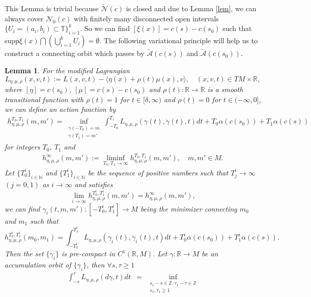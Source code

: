 \documentclass{amsart}
\newtheorem{lem}[thm]{Lemma}
\begin{document}
This Lemma is trivial because $\widetilde{\mathcal{N}}(c)$ is closed and due to Lemma \ref{lem}, we can always cover ${\mathcal{N}}_0(c)$ with finitely many disconnected open intervals $\{U_i=(a_i,b_i)\subset{\mathbb{T}}\}_{i=1}^k$. So we can find $[\xi(x)]=c(s)-c(s_0)$ such that supp$\xi(x)\bigcap(\bigcup_{i=1}^kU_i)=\emptyset$. The following variational principle will help us to construct a connecting orbit which passes by $\widetilde{\mathcal{A}}(c(s))$ and $\widetilde{\mathcal{A}}(c(s_0))$.
\begin{lem}\cite{CY1, CY2}
For the modified Lagrangian
\[
L_{\eta,\mu,\rho}(x,v,t):=L(x,v,t)-\langle\eta(x)+\rho(t)\mu(x),v\rangle,\quad(x,v,t)\in TM\times{\mathbb{R}},
\]
where $[\eta]=c(s_0)$, $[\mu]=c(s)-c(s_0)$ and $\rho(t):{\mathbb{R}}\rightarrow{\mathbb{R}}$ is a smooth transitional function with $\rho(t)=1$ for $t\in[\delta,\infty)$ and $\rho(t)=0$ for $t\in(-\infty,0]$, we can define an action function by
\begin{eqnarray}
h_{\eta,\mu,\rho}^{T_0,T_1}(m,m')=\inf_{\substack{\gamma(-T_0)=m\\ \gamma(T_1)=m'}}\int_{-T_0}^{T_1}L_{\eta,\mu,\rho}(\gamma(t),\dot{\gamma}(t),t)dt+T_0\alpha(c(s_0))+T_1\alpha(c(s))
\end{eqnarray}
for integers $T_0$, $T_1$ and
\begin{eqnarray}\label{pseudo}
h_{\eta,\mu,\rho}^\infty(m,m'):=\liminf_{T_0,T_1\rightarrow\infty}h_{\eta,\mu,\rho}^{T_0,T_1}(m,m'),\quad m,m'\in M.
\end{eqnarray}
Let $\{T_0^i\}_{i\in\mathbb{N}}$ and $\{T_1^i\}_{i\in\mathbb{N}}$ be the sequence of positive numbers such that $T_j^i\rightarrow\infty$ $(j=0,1)$ as $i\rightarrow\infty$ and satisfies
\[
\lim_{i\rightarrow\infty}h_{\eta,\mu,\rho}^{T_0^i,T_1^i}(m,m')=h_{\eta,\mu,\rho}^{\infty}(m,m'),
\]
we can find $\gamma_i(t,m,m'):[-T_0^i,T_1^i]\rightarrow M$ being the minimizer connecting $m_0$ and $m_1$ such that
\[
h_{\eta,\mu,\rho}^{T_0^i,T_1^i}(m_0,m_1)=\int_{-T_0^i}^{T_1^i}L_{\eta,\mu,\rho}(\gamma_i(t),\dot{\gamma}_i(t),t)dt+T_0^i\alpha(c(s_0))+T_1^i\alpha(c(s)).
\]
Then the set $\{\gamma_i\}$ is pre-compact in $C^1(\mathbb{R},M)$. Let $\gamma:\mathbb{R}\rightarrow M$ be an accumulation orbit of $\{\gamma_i\}$, then $\forall s,\tau\geq1$
\begin{eqnarray}\label{pseudo curve}
\int _{-s}^\tau L_{\eta,\mu,\rho}(d{\gamma},t) dt&=&\inf_{\substack{s_1-s\in\mathbb{Z},\tau_1-\tau\in\mathbb{Z}\nonumber\\
s_1,\tau_1\geq1\\
}}
\end{eqnarray}
\end{lem}
\end{document}
